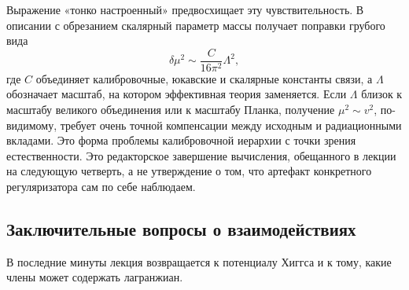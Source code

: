 \begin{classroomqa}
\end{classroomqa}

Выражение «тонко настроенный» предвосхищает эту чувствительность. В описании с обрезанием скалярный параметр массы получает поправки грубого вида
\begin{equation}
  \delta\mu^2
  \sim
  \frac{C}{16\pi^2}\Lambda^2,
  \label{eq:l10-higgs-quadratic-sensitivity}
\end{equation}
где \(C\) объединяет калибровочные, юкавские и скалярные константы связи, а \(\Lambda\) обозначает масштаб, на котором эффективная теория заменяется. Если \(\Lambda\) близок к масштабу великого объединения или к масштабу Планка, получение \(\mu^2\sim v^2\), по-видимому, требует очень точной компенсации между исходным и радиационными вкладами. Это форма проблемы калибровочной иерархии с точки зрения естественности. Это редакторское завершение вычисления, обещанного в лекции на следующую четверть, а не утверждение о том, что артефакт конкретного регуляризатора сам по себе наблюдаем.

\begin{classroomqa}
\end{classroomqa}

\subsection{Заключительные вопросы о взаимодействиях}

В последние минуты лекция возвращается к потенциалу Хиггса и к тому, какие члены может содержать лагранжиан.

